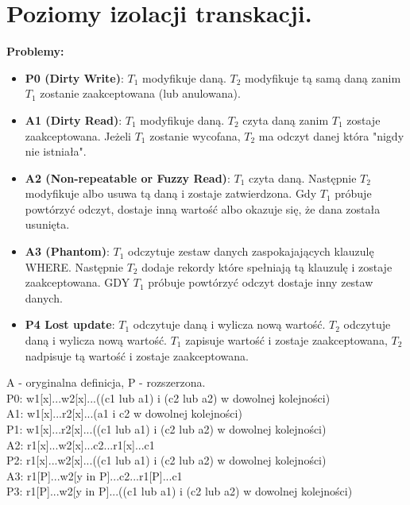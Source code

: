 \documentclass[a4paper]{article}
\begin{document}
    \section{Poziomy izolacji transkacji.}
    \textbf{Problemy:}
    \begin{itemize}
        \item \textbf{P0 (Dirty Write)}: $T_1$ modyfikuje daną. $T_2$ modyfikuje tą samą daną zanim $T_1$ zostanie zaakceptowana (lub anulowana).
        \item \textbf{A1 (Dirty Read)}: $T_1$ modyfikuje daną. $T_2$ czyta daną zanim $T_1$ zostaje zaakceptowana. Jeżeli $T_1$ zostanie wycofana, $T_2$ ma odczyt danej która "nigdy nie istniała".
        \item \textbf{A2 (Non-repeatable or Fuzzy Read)}: $T_1$ czyta daną. Następnie $T_2$ modyfikuje albo usuwa tą daną i zostaje zatwierdzona. Gdy $T_1$ próbuje powtórzyć odczyt, dostaje inną wartość albo okazuje się, że dana została usunięta.
        \item \textbf{A3 (Phantom)}: $T_1$ odczytuje zestaw danych zaspokajających klauzulę WHERE. Następnie $T_2$ dodaje rekordy które spełniają tą klauzulę i zostaje zaakceptowana. GDY $T_1$ próbuje powtórzyć odczyt dostaje inny zestaw danych.
        \item \textbf{P4 Lost update}: $T_1$ odczytuje daną i wylicza nową wartość. $T_2$ odczytuje daną i wylicza nową wartość. $T_1$ zapisuje wartość i zostaje zaakceptowana, $T_2$ nadpisuje tą wartość i zostaje zaakceptowana.
    \end{itemize}

    A - oryginalna definicja, P - rozszerzona.\\

    P0: w1[x]...w2[x]...((c1 lub a1) i (c2 lub a2) w dowolnej kolejności)\\

    A1: w1[x]...r2[x]...(a1 i c2 w dowolnej kolejności)\\
    P1: w1[x]...r2[x]...((c1 lub a1) i (c2 lub a2) w dowolnej kolejności)\\

    A2: r1[x]...w2[x]...c2...r1[x]...c1\\
    P2: r1[x]...w2[x]...((c1 lub a1) i (c2 lub a2) w dowolnej kolejności)\\

    A3: r1[P]...w2[y in P]...c2...r1[P]...c1\\
    P3: r1[P]...w2[y in P]...((c1 lub a1) i (c2 lub a2) w dowolnej kolejności)\\
\end{document}
